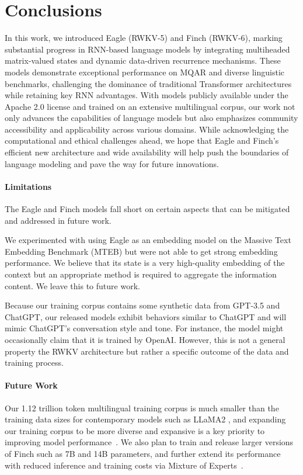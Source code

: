 \section{Conclusions} \label{conclusions}
In this work, we introduced Eagle (RWKV-5) and Finch (RWKV-6), marking substantial progress in RNN-based language models by integrating multiheaded matrix-valued states and dynamic data-driven recurrence mechanisms. These models demonstrate exceptional performance on MQAR and diverse linguistic benchmarks, challenging the dominance of traditional Transformer architectures while retaining key RNN advantages. With models publicly available under the Apache 2.0 license and trained on an extensive multilingual corpus, our work not only advances the capabilities of language models but also emphasizes community accessibility and applicability across various domains. While acknowledging the computational and ethical challenges ahead, we hope that Eagle and Finch's efficient new architecture and wide availability will help push the boundaries of language modeling and pave the way for future innovations.

\paragraph{Limitations}
The Eagle and Finch models fall short on certain aspects that can be mitigated and addressed in future work.

We experimented with using Eagle as an embedding model on the Massive Text Embedding Benchmark (MTEB) \citep{muennighoff2023mteb} but were not able to get strong embedding performance. We believe that its state is a very high-quality embedding of the context but an appropriate method is required to aggregate the information content. We leave this to future work.

Because our training corpus contains some synthetic data from GPT-3.5 and ChatGPT, our released models exhibit behaviors similar to ChatGPT and will mimic ChatGPT's conversation style and tone. For instance, the model might occasionally claim that it is trained by OpenAI. However, this is not a general property the RWKV architecture but rather a specific outcome of the data and training process.

\paragraph{Future Work} \label{future_work}

Our 1.12 trillion token multilingual training corpus is much smaller than the training data sizes for contemporary models such as LLaMA2 \citep{touvron2023llama}, and expanding our training corpus to be more diverse and expansive is a key priority to improving model performance~\citep{albalak2024survey}. We also plan to train and release larger versions of Finch such as 7B and 14B parameters, and further extend its performance with reduced inference and training costs via Mixture of Experts~\citep{shazeer2017outrageously}.

